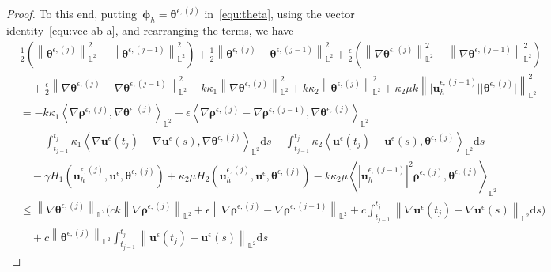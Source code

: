 \documentclass[11pt,reqno]{amsart}
\theoremstyle{definition}
\numberwithin{equation}{section}
\newcommand{\bff}{\boldsymbol}
\newcommand{\bb}{\mathbb}
\newcommand{\ds}{\mathrm{d}s}
\newcommand{\nn}{\nonumber}
\newcommand{\norm}[2]{\left\|{#1}\right\|_{#2}}
\newcommand{\inpro}[2]{\left\langle#1,#2\right\rangle}
\begin{document}
\begin{proof}
To this end, putting~$\bff{\phi}_h=\bff{\theta}^{\epsilon, (j)}$ in~\eqref{equ:theta}, using the vector
identity~\eqref{equ:vec ab a}, and rearranging the terms, we have
\begin{align}\label{equ:theta sum}
	&\frac{1}{2} \left(\norm{\bff{\theta}^{\epsilon, (j)}}{\bb{L}^2}^2 - \norm{\bff{\theta}^{\epsilon, (j-1)}}{\bb{L}^2}^2\right)
	+
	\frac{1}{2} \norm{\bff{\theta}^{\epsilon, (j)}- \bff{\theta}^{\epsilon, (j-1)}}{\bb{L}^2}^2
	+
	\frac{\epsilon}{2} \left(\norm{\nabla \bff{\theta}^{\epsilon, (j)}}{\bb{L}^2}^2 - \norm{\nabla \bff{\theta}^{\epsilon, (j-1)}}{\bb{L}^2}^2\right)
	\nn \\
	&\quad
	+
	\frac{\epsilon}{2} \norm{\nabla \bff{\theta}^{\epsilon, (j)}- \nabla \bff{\theta}^{\epsilon, (j-1)}}{\bb{L}^2}^2
	+
	k\kappa_1 \norm{\nabla \bff{\theta}^{\epsilon, (j)}}{\bb{L}^2}^2
	+
	k\kappa_2 \norm{\bff{\theta}^{\epsilon, (j)}}{\bb{L}^2}^2
	+
	\kappa_2 \mu k \norm{\big|\bff{u}_h^{\epsilon, (j-1)}\big| \big|\bff{\theta}^{\epsilon, (j)}\big|}{\bb{L}^2}^2
	\nn \\
	&=
	-
	k\kappa_1 \inpro{\nabla\bff{\rho}^{\epsilon, (j)}}{\nabla\bff{\theta}^{\epsilon, (j)}}_{\bb{L}^2}
	-
	\epsilon\inpro{\nabla\bff{\rho}^{\epsilon, (j)}-\nabla\bff{\rho}^{\epsilon, (j-1)}}{\nabla\bff{\theta}^{\epsilon, (j)}}_{\bb{L}^2}
	\nn \\
	&\quad
	-
	\int_{t_{j-1}}^{t_j} \kappa_1 \inpro{\nabla\bff{u}^\epsilon(t_j)- \nabla \bff{u}^\epsilon(s)}{\nabla\bff{\theta}^{\epsilon, (j)}}_{\bb{L}^2} \ds
	-
	\int_{t_{j-1}}^{t_j} \kappa_2 \inpro{\bff{u}^\epsilon(t_j)- \bff{u}^\epsilon(s)}{\bff{\theta}^{\epsilon, (j)}}_{\bb{L}^2} \ds
	\nn \\
	&\quad
	-
	\gamma H_1(\bff{u}_h^{\epsilon, (j)},\bff{u}^\epsilon,\bff{\theta}^{\epsilon, (j)}) 
 	+ 
 	\kappa_2 \mu
	H_2(\bff{u}_h^{\epsilon, (j)},\bff{u}^\epsilon,\bff{\theta}^{\epsilon, (j)}) 
 	-
 	k \kappa_2 \mu
 	\inpro{|\bff{u}_h^{\epsilon, (j-1)}|^2 \bff{\rho}^{\epsilon, (j)}}{\bff{\theta}^{\epsilon, (j)}}_{\bb{L}^2}
	\nn \\
	&\le
	\norm{\nabla\bff{\theta}^{\epsilon, (j)}}{\bb{L}^2} 
	\Big(
		c k \norm{\nabla\bff{\rho}^{\epsilon, (j)}}{\bb{L}^2} 
		+
		\epsilon \norm{\nabla\bff{\rho}^{\epsilon, (j)}-\nabla\bff{\rho}^{\epsilon, (j-1)}}{\bb{L}^2} 
		+
		c \int_{t_{j-1}}^{t_j}
		\norm{\nabla\bff{u}^\epsilon(t_j)-\nabla\bff{u}^\epsilon(s)}{\bb{L}^2} \ds
	\Big)
	\nn \\
	&\quad
	+
	c\norm{\bff{\theta}^{\epsilon, (j)}}{\bb{L}^2} 
	\int_{t_{j-1}}^{t_j} 
	\norm{\bff{u}^\epsilon(t_j)-\bff{u}^\epsilon(s)}{\bb{L}^2} \ds

\end{align}
\end{proof}
\end{document}
